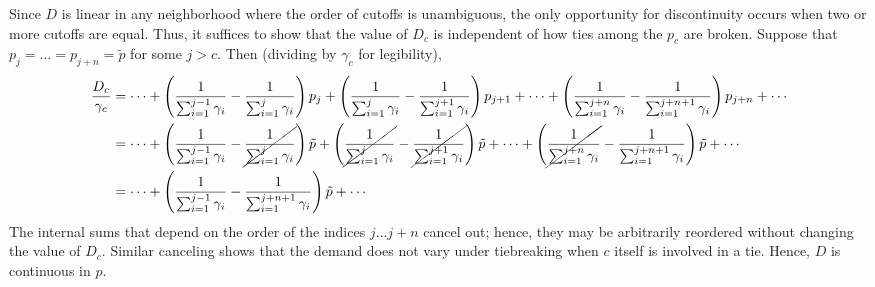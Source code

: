 \documentclass[12pt]{article}
\theoremstyle{definition}
\begin{document}
\normalsize Since $D$ is linear in any neighborhood where the order of cutoffs is unambiguous, the only opportunity for discontinuity occurs when two or more cutoffs are equal. Thus, it suffices to show that the value of $D_c$ is independent of how ties among the $p_c$ are broken. Suppose that $p_j = \dots = p_{j+n} = \tilde p$ for some $j > c$. Then (dividing by $\gamma_c$ for legibility),
\scriptsize \begin{align}
\frac{D_c}{\gamma_c} &= \cdots
+ \left(\frac{1}{\sum_{i=1}^{j-1} \gamma_i} - \frac{1}{\sum_{i=1}^{j} \gamma_i} \right) p_{j}
+ \left(\frac{1}{\sum_{i=1}^{j} \gamma_i} - \frac{1}{\sum_{i=1}^{j+1} \gamma_i} \right) p_{j+1}
+ \cdots
+ \left(\frac{1}{\sum_{i=1}^{j+n} \gamma_i} - \frac{1}{\sum_{i=1}^{j+n+1} \gamma_i}\right) p_{j+n}
+ \cdots \\
&= \cdots
+ \left(\frac{1}{\sum_{i=1}^{j-1} \gamma_i} - \cancel{\frac{1}{\sum_{i=1}^{j} \gamma_i}} \right) \tilde p
+ \left(\cancel{\frac{1}{\sum_{i=1}^{j} \gamma_i}} - \cancel{\frac{1}{\sum_{i=1}^{j+1} \gamma_i}} \right) \tilde p
+ \cdots
+ \left(\cancel{\frac{1}{\sum_{i=1}^{j+n} \gamma_i}} - \frac{1}{\sum_{i=1}^{j+n+1} \gamma_i}\right) \tilde p
+ \cdots \\
&= \cdots
+ \left(\frac{1}{\sum_{i=1}^{j-1} \gamma_i} - \frac{1}{\sum_{i=1}^{j+n+1} \gamma_i}\right) \tilde p
+ \cdots
\end{align}
\normalsize The internal sums that depend on the order of the indices $j \dots j+n$ cancel out; hence, they may be arbitrarily reordered without changing the value of $D_c$. Similar canceling shows that the demand does not vary under tiebreaking when $c$ itself is involved in a tie. Hence, $D$ is continuous in $p$. 
\end{document}
